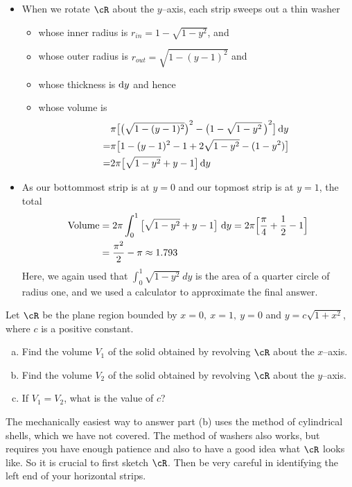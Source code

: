 \begin{solution}
\begin{itemize}
\item When we rotate $\cR$ about the $y$--axis,  each strip
sweeps out a thin washer
\begin{itemize}
\item
whose inner radius is $r_{in}=1-\sqrt{1-y^2}$, and
\item
whose outer radius is $r_{out}= \sqrt{1-(y-1)^2}$ and
\item
whose thickness is $\mathrm{d}y$ and hence
\item
whose volume is
\begin{align*}
&\pi\big[{\big(\sqrt{1-(y-1)^2}\big)}^2-{\big(1-\sqrt{1-y^2}\,\big)}^2\big]\,\mathrm{d}y\\
=&\pi \big[  1 - (y-1)^2       -1 + 2\sqrt{1-y^2} - (1-y^2)   \big]\\
=&2\pi\big[\sqrt{1-y^2}+y-1\big]\,\mathrm{d}y\end{align*}

\end{itemize}
\item As our bottommost strip is at $y=0$ and our topmost
strip is at $y=1$, the total
\begin{align*}
{\rm Volume} &= 2\pi\int_{0}^1\big[\sqrt{1-y^2}+y-1\big]\ \mathrm{d}y
= 2\pi\Big[\frac{\pi}{4}+\frac{1}{2}-1\Big]\\
&=\frac{\pi^2}{2}-\pi\approx 1.793
\end{align*}
Here, we again used that $\int_{0}^1 \sqrt{1-y^2}\ dy$ is the area of a quarter
circle of radius one, and we used a calculator to approximate the final answer.
\end{itemize}

\end{solution}

\begin{Mquestion}[1997A]
Let $\cR$ be the plane region bounded by $x=0,\ x=1,\ y=0$
and $y=c\sqrt{1+x^2}$, where $c$ is a positive constant.
\begin{enumerate}[(a)]
\item
Find the volume $V_1$ of the solid obtained by revolving
$\cR$ about the $x$--axis.
\item
Find the volume $V_2$ of the solid obtained by revolving
$\cR$ about the $y$--axis.
\item
 If $V_1=V_2$, what is the value of $c$?
\end{enumerate}
\end{Mquestion}

\begin{hint}
The mechanically easiest way to answer part (b) uses the method of cylindrical
shells, which we have not covered.  The method of washers also works, but requires  you have enough patience and also
to have a good idea what $\cR$ looks like. So it is crucial to first sketch $\cR$.
Then be very careful in identifying the left end of your horizontal strips.
\end{hint}

